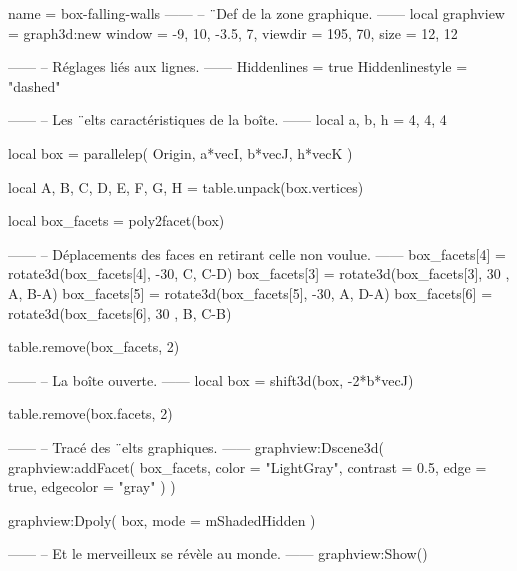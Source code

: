 \documentclass{standalone}
\begin{document}
\begin{luadraw}{name = box-falling-walls}
------
-- ¨Def de la zone graphique.
------
local graphview = graph3d:new{
  window  = {-9, 10, -3.5, 7},
  viewdir = {195, 70},
  size    = {12, 12}
}

------
-- Réglages liés aux lignes.
------
Hiddenlines     = true
Hiddenlinestyle = "dashed"

------
-- Les ¨elts caractéristiques de la boîte.
------
local a, b, h = 4, 4, 4

local box = parallelep(
  Origin,
  a*vecI, b*vecJ, h*vecK
)

local A, B, C, D, E, F, G, H = table.unpack(box.vertices)

local box_facets = poly2facet(box)

------
-- Déplacements des faces en retirant celle non voulue.
------
box_facets[4] = rotate3d(box_facets[4], -30, {C, C-D})
box_facets[3] = rotate3d(box_facets[3], 30 , {A, B-A})
box_facets[5] = rotate3d(box_facets[5], -30, {A, D-A})
box_facets[6] = rotate3d(box_facets[6], 30 , {B, C-B})

table.remove(box_facets, 2)

------
-- La boîte ouverte.
------
local box = shift3d(box, -2*b*vecJ)

table.remove(box.facets, 2)

------
-- Tracé des ¨elts graphiques.
------
graphview:Dscene3d(
  graphview:addFacet(
    box_facets,
    {
      color     = "LightGray",
      contrast  = 0.5,
      edge      = true,
      edgecolor = "gray"
    }
  )
)

graphview:Dpoly(
  box,
  {mode = mShadedHidden}
)

------
-- Et le merveilleux se révèle au monde.
------
graphview:Show()
\end{luadraw}
\end{document}

